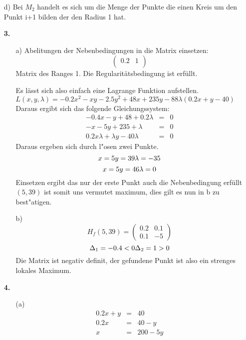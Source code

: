 \documentclass[a4paper,11pt,fleqn]{scrartcl}
\begin{document}
\begin{enumerate}
        \item[d)]
            Bei $M_2$ handelt es sich um die Menge der Punkte die einen Kreis um den Punkt i+1 bilden der den Radius 1 hat.
    \item[\textbf{3.}]
        \begin{enumerate}
            \item[a)]
                Abelitungen der Nebenbedingungen in die Matrix einsetzen:
                \[ 
                \begin{pmatrix}
                    0.2 & 1 \\
                \end{pmatrix}
                \]
                Matrix des Ranges 1. Die Regularitätsbedingung ist erfüllt.

                Es lässt sich also einfach eine Lagrange Funktion aufstellen. \\
                $L(x,y,\lambda) = -0.2x^2 - xy - 2.5y^2 + 48x + 235y - 88 \lambda(0.2x+y-40)$ \\
                Daraus ergibt sich das folgende Gleichungssystem:
                \begin{eqnarray*}
                    -0.4x - y+48 + 0.2 \lambda &=& 0\\
                    -x - 5y + 235 + \lambda &=& 0\\
                    0.2x\lambda + \lambda y -40\lambda &=& 0 
                \end{eqnarray*} 
                Daraus ergeben sich durch l"osen zwei Punkte.
                \[x = 5  \\ 
                y = 39 \\
                \lambda = -35\]
                \[x = 5  \\ 
                y = 46 \\
                \lambda = 0\]     
                Einsetzen ergibt das nur der erste Punkt auch die Nebenbedingung erfüllt $(5,39)$ ist somit uns vermutet maximum, dies gilt es nun in b zu best"atigen.
            \item[b)]
                \[H_f(5, 39) =
                \begin{pmatrix}
                    0.2 & 0.1 \\
                    0.1 & -5
                \end{pmatrix} \]
                \[
                \Delta_1 = -0.4 < 0 \\
                \Delta_2 = 1 > 0
                \]
                Die Matrix ist negativ definit, der gefundene Punkt ist also ein strenges lokales Maximum.
        \end{enumerate}
    \item[\textbf{4.}]
        \begin{enumerate}
            \item[(a)]
                \begin{eqnarray*}
                    0.2x+y &=& 40\\
                    0.2x &=& 40-y\\
                    x &=& 200 - 5y 
                \end{eqnarray*}


\end{enumerate}
\end{enumerate}
\end{document}
